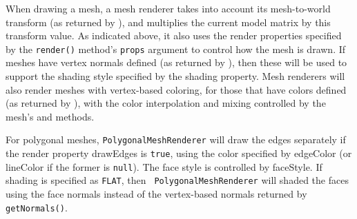 When drawing a mesh, a mesh renderer takes into account its
mesh-to-world transform (as returned by
), and
multiplies the current model matrix by this transform value.  As
indicated above, it also uses the render properties specified by the
{\tt render()} method's {\tt props} argument to control how the mesh is
drawn.  If meshes have vertex normals defined (as returned by
), then these will
be used to support the shading style specified by the {\sf shading}
property.  Mesh renderers will also render meshes with vertex-based
coloring, for those that have colors defined (as returned by
), with the color
interpolation and mixing controlled by the mesh's
 and
methods.

For polygonal meshes, {\tt PolygonalMeshRenderer} will draw the edges
separately if the render property {\sf drawEdges} is {\tt true}, using
the color specified by {\sf edgeColor} (or {\sf lineColor} if the
former is {\tt null}). The face style is controlled by {\sf
faceStyle}. If {\sf shading} is specified as {\tt FLAT}, then {\tt
PolygonalMeshRenderer} will shaded the faces using the face normals
instead of the vertex-based normals returned by {\tt getNormals()}.

